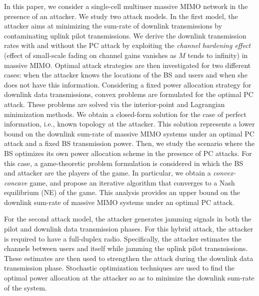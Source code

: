\documentclass[draftclsnofoot, 12pt, onecolumn, journal]{IEEEtran}
\begin{document}
In this paper, we consider a single-cell multiuser massive MIMO network in the presence of an attacker.
We study two attack models.
In the first model, the attacker aims at minimizing the sum-rate of downlink transmissions by contaminating uplink pilot transmissions.
We derive the downlink transmission rates with and without the PC attack by exploiting the \textit{channel hardening effect} (effect of small-scale fading on channel gains vanishes as $M$ tends to infinity) in massive MIMO.
Optimal attack strategies are then investigated for two different cases: when the attacker knows the locations of the BS and users and when she does not have this information. 
Considering a fixed power allocation strategy for downlink data transmissions, convex problems are formulated for the optimal PC attack.
These problems are solved via the interior-point and Lagrangian minimization methods.
We obtain a closed-form solution for the case of perfect information, i.e., known topology at the attacker.
This solution represents a lower bound on the downlink sum-rate of massive MIMO systems under an optimal PC attack and a fixed BS transmission power.
Then, we study the scenario where the BS optimizes its own power allocation scheme in the presence of PC attacks.
For this case, a game-theoretic problem formulation is considered in which the BS and attacker are the players of the game.
In particular, we obtain a \textit{convex-concave} game, and propose an iterative algorithm that converges to a Nash equilibrium (NE) of the game.
This analysis provides an upper bound on the downlink sum-rate of massive MIMO systems under an optimal PC attack.

For the second attack model, the attacker generates jamming signals in both the pilot and downlink data transmission phases.
For this hybrid attack, the attacker is required to have a full-duplex radio.
Specifically, the attacker estimates the channels between users and itself while jamming the uplink pilot transmissions.
These estimates are then used to strengthen the attack during the downlink data transmission phase.
Stochastic optimization techniques are used to find the optimal power allocation at the attacker so as to minimize the downlink sum-rate of the system.
\end{document}
